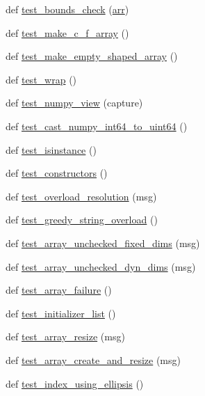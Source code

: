 \begin{DoxyCompactItemize}
\item 
def \mbox{\hyperlink{namespacetest__numpy__array_ab43c8bd8e6edf8507060a62db376dac8}{test\+\_\+bounds\+\_\+check}} (\mbox{\hyperlink{test__numpy__array_8cpp_a42c56bc9bb4c61baf74b3b581765cbd9}{arr}})
\item 
def \mbox{\hyperlink{namespacetest__numpy__array_ac8b6a40df9e9e013c13fc0b508a04095}{test\+\_\+make\+\_\+c\+\_\+f\+\_\+array}} ()
\item 
def \mbox{\hyperlink{namespacetest__numpy__array_a1f827bee6540914f10a16cd2541e86be}{test\+\_\+make\+\_\+empty\+\_\+shaped\+\_\+array}} ()
\item 
def \mbox{\hyperlink{namespacetest__numpy__array_a4190d99d9fdb9025143f5b4104bcf1cc}{test\+\_\+wrap}} ()
\item 
def \mbox{\hyperlink{namespacetest__numpy__array_a78985bf76212c7f7452a1af61c792e3c}{test\+\_\+numpy\+\_\+view}} (capture)
\item 
def \mbox{\hyperlink{namespacetest__numpy__array_a832f35064efa44525a2c4c04ab23b507}{test\+\_\+cast\+\_\+numpy\+\_\+int64\+\_\+to\+\_\+uint64}} ()
\item 
def \mbox{\hyperlink{namespacetest__numpy__array_aca1ab4916ce0e9ee69fdef69ac2dfd63}{test\+\_\+isinstance}} ()
\item 
def \mbox{\hyperlink{namespacetest__numpy__array_af01d57dcd94f53599ab912891bb7f714}{test\+\_\+constructors}} ()
\item 
def \mbox{\hyperlink{namespacetest__numpy__array_a9466962719f3827c68a1ebb3944c8dcf}{test\+\_\+overload\+\_\+resolution}} (msg)
\item 
def \mbox{\hyperlink{namespacetest__numpy__array_aabbd61e82f9b937cd595911fbdfbbb70}{test\+\_\+greedy\+\_\+string\+\_\+overload}} ()
\item 
def \mbox{\hyperlink{namespacetest__numpy__array_ac7f99dc17d8674f983970f8649e2241e}{test\+\_\+array\+\_\+unchecked\+\_\+fixed\+\_\+dims}} (msg)
\item 
def \mbox{\hyperlink{namespacetest__numpy__array_ae35f89988c9d477aab4bce997984157f}{test\+\_\+array\+\_\+unchecked\+\_\+dyn\+\_\+dims}} (msg)
\item 
def \mbox{\hyperlink{namespacetest__numpy__array_a70829b1256298b24ac0b83ee71ff92cc}{test\+\_\+array\+\_\+failure}} ()
\item 
def \mbox{\hyperlink{namespacetest__numpy__array_a5849e6a2b99497622e3ba63091ae9e1d}{test\+\_\+initializer\+\_\+list}} ()
\item 
def \mbox{\hyperlink{namespacetest__numpy__array_a8c38a6d064649e80bd540de665bea700}{test\+\_\+array\+\_\+resize}} (msg)
\item 
def \mbox{\hyperlink{namespacetest__numpy__array_a66b347b2471489acdd3585b3bc8a0314}{test\+\_\+array\+\_\+create\+\_\+and\+\_\+resize}} (msg)
\item 
def \mbox{\hyperlink{namespacetest__numpy__array_af7699d7ad6a15677a3cd5557287e0b53}{test\+\_\+index\+\_\+using\+\_\+ellipsis}} ()
\end{DoxyCompactItemize}
